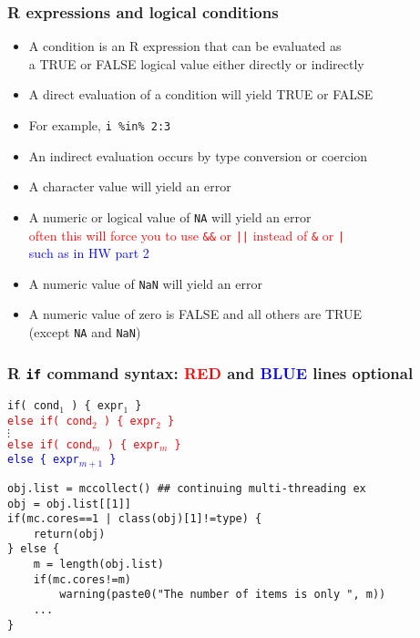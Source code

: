 \documentclass[11pt,pdftex,dvipsnames,usenames,helvetica]{beamer}
\begin{document}
\begin{frame}[fragile]
\frametitle{R expressions and logical conditions}

\begin{itemize}
\item A condition is an R expression that can be evaluated as\\ a TRUE or FALSE logical value either directly or indirectly
\item A direct evaluation of a condition will yield TRUE or FALSE 
\item For example, {\tt i \%in\% 2:3}
\item An indirect evaluation occurs by type conversion or coercion
\item A character value will yield an error
\item A numeric or logical value of {\tt NA} will yield an error\\
\textcolor{red}{often this will force you to use {\tt \&\&} or {\tt ||}
instead of {\tt \&} or {\tt |}}\\
\textcolor{blue}{such as in HW part 2}
\item A numeric value of {\tt NaN} will yield an error
\item A numeric value of zero is FALSE and all others are TRUE\\
(except {\tt NA} and {\tt NaN})
\end{itemize}

\end{frame}

\begin{frame}[fragile] 
\frametitle{R {\tt if} command syntax:  \textcolor{red}{RED} and
\textcolor{blue}{BLUE} lines optional}

{\tt if( cond$_1$ ) \{ expr$_1$ \}  \\
\textcolor{red}{else if( cond$_2$ ) \{ expr$_2$ \}} \\
$\vdots$ \\
\textcolor{red}{else if( cond$_m$ ) \{ expr$_{m}$ \}} \\
\textcolor{blue}{else \{ expr$_{m+1}$ \}} }

\begin{verbatim}
obj.list = mccollect() ## continuing multi-threading ex
obj = obj.list[[1]]
if(mc.cores==1 | class(obj)[1]!=type) {
    return(obj)
} else {
    m = length(obj.list)
    if(mc.cores!=m) 
        warning(paste0("The number of items is only ", m))
    ...
}
\end{verbatim}
\end{frame}
\end{document}
